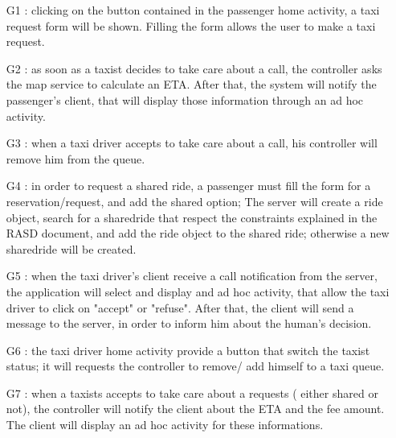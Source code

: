 
\begin{itemize}
 \item[G1]: clicking on the button contained in the passenger home activity, a taxi request form will be shown. 
  Filling the form allows the user to make a taxi request.
 \item[G2]: as soon as a taxist decides to take care about a call, the controller asks the map service to calculate an ETA. 
 After that, the system will notify the passenger's client, that will display those information through an ad hoc activity.
 \item[G3]: when a taxi driver accepts to take care about a call, his controller will remove him from the queue.
 \item[G4]: in order to request a shared ride, a passenger must fill the form for a reservation/request, and add the shared option;
 The server will create a ride object, search for a sharedride that respect the constraints explained in the RASD document,
 and add the ride object to the shared ride; otherwise a new sharedride will be created.
 \item[G5]: when the taxi driver's client receive a call notification from the server, the application will select and display 
 and ad hoc activity, that allow the taxi driver to click on "accept" or "refuse". After that, the client will send a message to the
 server, in order to inform him about the human's decision.
 \item[G6]: the taxi driver home activity provide a button that switch the taxist status; it will requests the controller to 
 remove/ add himself to a taxi queue.
 \item[G7]: when a taxists accepts to take care about a requests ( either shared or not), the controller will notify the client about
 the ETA and the fee amount. The client will display an ad hoc activity for these informations. 
\end{itemize}

